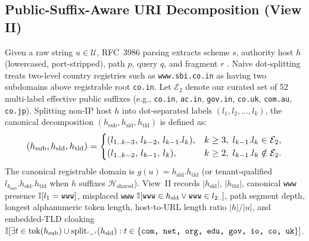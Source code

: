 \documentclass[conference]{IEEEtran}
\begin{document}
\subsection{Public-Suffix-Aware URI Decomposition (View II)}
Given a raw string $u \in \mathcal{U}$, RFC~3986 parsing extracts scheme $s$, authority host $h$ (lowercased, port-stripped), path $p$, query $q$, and fragment $r$ \cite{rfc3986}. Naive dot-splitting treats two-level country registries such as \texttt{www.sbi.co.in} as having two subdomains above registrable root \texttt{co.in}. Let $\mathcal{E}_{2}$ denote our curated set of 52 multi-label effective public suffixes (e.g., \texttt{co.in}, \texttt{ac.in}, \texttt{gov.in}, \texttt{co.uk}, \texttt{com.au}, \texttt{co.jp}). Splitting non-IP host $h$ into dot-separated labels $(l_1, l_2, \dots, l_k)$, the canonical decomposition $(h_{\text{sub}}, h_{\text{sld}}, h_{\text{tld}})$ is defined as:
\begin{equation}
\resizebox{0.89\columnwidth}{!}{$\displaystyle
(h_{\text{sub}}, h_{\text{sld}}, h_{\text{tld}}) =
\begin{cases}
(l_{1..k-3},\, l_{k-2},\, l_{k-1}.l_k), & k \ge 3,\; l_{k-1}.l_k \in \mathcal{E}_{2}, \\
(l_{1..k-2},\, l_{k-1},\, l_k), & k \ge 2,\; l_{k-1}.l_k \notin \mathcal{E}_{2}.
\end{cases}$}
\label{eq:etld}
\end{equation}
The canonical registrable domain is $g(u) = h_{\text{sld}}.h_{\text{tld}}$ (or tenant-qualified $l_{k_{\text{sub}}}.h_{\text{sld}}.h_{\text{tld}}$ when $h$ suffixes $\mathcal{H}_{\text{shared}}$). View~II records $|h_{\text{sld}}|$, $|h_{\text{tld}}|$, canonical \texttt{www} presence $\mathbb{I}[l_1 = \text{\texttt{www}}]$, misplaced \texttt{www} $\mathbb{I}[\text{\texttt{www}} \in h_{\text{sld}} \lor \text{\texttt{www}} \in l_{2..}]$, path segment depth, longest alphanumeric token length, host-to-URL length ratio $|h|/|u|$, and embedded-TLD cloaking $\mathbb{I}[\exists t \in \text{tok}(h_{\text{sub}}) \cup \text{split}_{'-'}(h_{\text{sld}}) : t \in \{\text{\texttt{com, net, org, edu, gov, io, co, uk}}\}]$.
\end{document}
